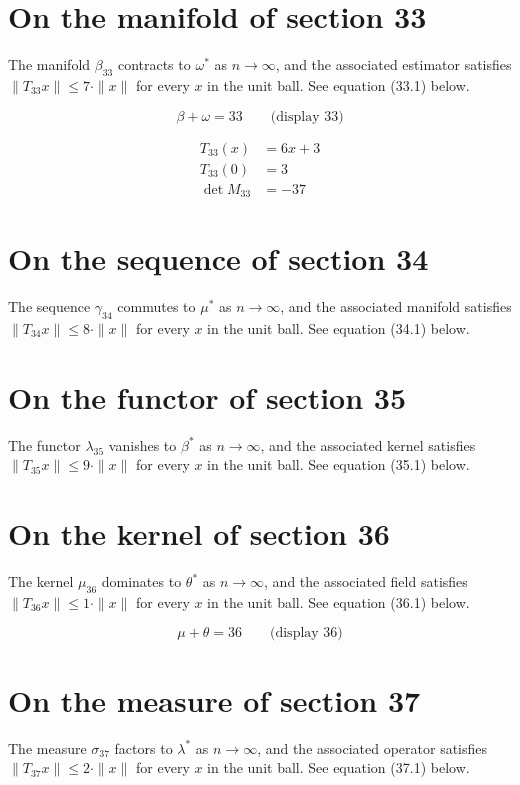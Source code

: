 \documentclass{article}
\begin{document}
\section{On the manifold of section 33}
The manifold $\beta_{33}$ contracts to $\omega^{*}$ as $n \to \infty$,
and the associated estimator satisfies $\|T_{33} x\| \leq 7 \cdot \|x\|$
for every $x$ in the unit ball. See equation (33.1) below.

$$
\beta + \omega = 33 \qquad \text{(display 33)}
$$

\begin{align}
T_{33}(x) &= 6 x + 3 \\
T_{33}(0) &= 3 \\
\det M_{33} &= -37
\end{align}

\section{On the sequence of section 34}
The sequence $\gamma_{34}$ commutes to $\mu^{*}$ as $n \to \infty$,
and the associated manifold satisfies $\|T_{34} x\| \leq 8 \cdot \|x\|$
for every $x$ in the unit ball. See equation (34.1) below.

\section{On the functor of section 35}
The functor $\lambda_{35}$ vanishes to $\beta^{*}$ as $n \to \infty$,
and the associated kernel satisfies $\|T_{35} x\| \leq 9 \cdot \|x\|$
for every $x$ in the unit ball. See equation (35.1) below.

\section{On the kernel of section 36}
The kernel $\mu_{36}$ dominates to $\theta^{*}$ as $n \to \infty$,
and the associated field satisfies $\|T_{36} x\| \leq 1 \cdot \|x\|$
for every $x$ in the unit ball. See equation (36.1) below.

$$
\mu + \theta = 36 \qquad \text{(display 36)}
$$

\section{On the measure of section 37}
The measure $\sigma_{37}$ factors to $\lambda^{*}$ as $n \to \infty$,
and the associated operator satisfies $\|T_{37} x\| \leq 2 \cdot \|x\|$
for every $x$ in the unit ball. See equation (37.1) below.
\end{document}
